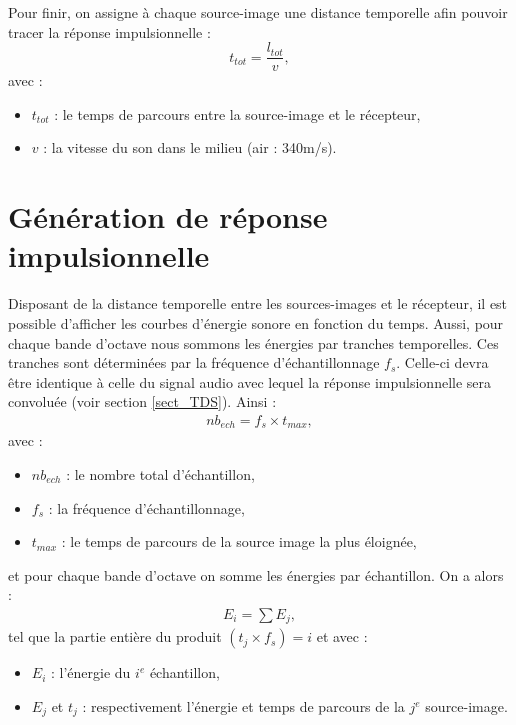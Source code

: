Pour finir, on assigne à chaque source-image une distance temporelle afin pouvoir tracer la réponse impulsionnelle :
\begin{equation}
 t_{tot} =  \frac{l_{tot}}{v},
\end{equation}
avec : 
\begin{itemize}
\item$ t_{tot}$ : le temps de parcours entre la source-image et le récepteur,
\item$v$ : la vitesse du son dans le milieu (air : 340m/s).
\end{itemize}


\section{Génération de réponse impulsionnelle} \label{sect_rir}

Disposant de la distance temporelle entre les sources-images et le récepteur, il est possible d'afficher les courbes d'énergie sonore en fonction du temps. Aussi, pour chaque bande d'octave nous sommons les énergies par tranches temporelles. Ces tranches sont déterminées par la fréquence d'échantillonnage $f_s$. Celle-ci devra être identique à celle du signal audio avec lequel la réponse impulsionnelle sera convoluée (voir section \ref{sect_TDS}). Ainsi :
\begin{align}
nb_{ech} = f_s \times t_{max}, 
\end{align}
avec : 
\begin{itemize}
\item$nb_{ech}$ : le nombre total d'échantillon,
\item$f_s$ : la fréquence d'échantillonnage,
\item$t_{max}$ : le temps de parcours de la source image la plus éloignée,
\end{itemize}

%
et pour chaque bande d'octave on somme les énergies par échantillon. On a alors : 
%
\begin{align}
E_{i} =  \sum{E_j},
\end{align}
tel que la partie entière du produit  $(t_j \times f_s) = i$
et avec : 
\begin{itemize}
\item$E_{i}$ : l'énergie du $i^e$ échantillon,
\item$E_j$ et $t_j$ : respectivement l'énergie et temps de parcours de la $j^e$ source-image.
\end{itemize}


